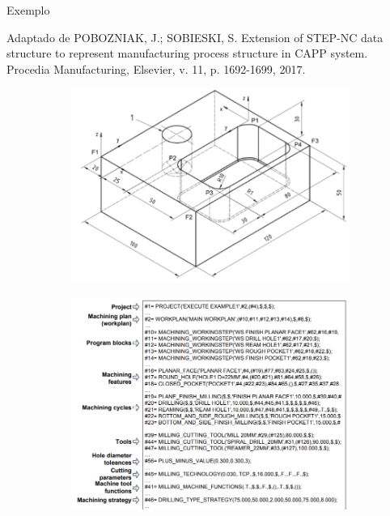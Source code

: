 \documentclass[aspectratio=169]{beamer}
\begin{document}
{\begin{frame}{Exemplo}

  Adaptado de POBOZNIAK, J.; SOBIESKI, S. Extension of STEP-NC data structure to represent
  manufacturing process structure in CAPP system. Procedia Manufacturing, Elsevier,
  v. 11, p. 1692-1699, 2017.

  \begin{figure}[H]
    \centering
    \begin{subfigure}[b]{0.46\textwidth}
        \includegraphics[width=\textwidth]{part1.png}
    \end{subfigure}
    \qquad
    \begin{subfigure}[b]{0.46\textwidth}
        \includegraphics[width=\textwidth]{step-nc-sample-1.png}
    \end{subfigure}
\end{figure}


\end{frame}}
\end{document}
